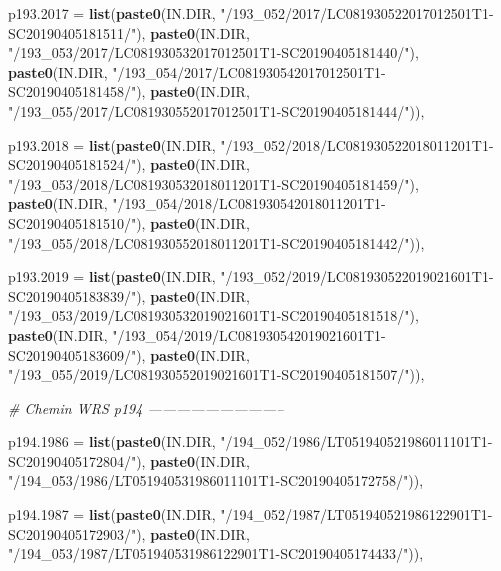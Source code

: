 \documentclass[a4paper, notitlepage, 12pt, krantz2]{krantz}
\newenvironment{Shaded}{\begin{snugshade}}{\end{snugshade}}
\newcommand{\CommentTok}[1]{\textcolor[rgb]{0.56,0.35,0.01}{\textit{#1}}}
\newcommand{\DataTypeTok}[1]{\textcolor[rgb]{0.13,0.29,0.53}{#1}}
\newcommand{\KeywordTok}[1]{\textcolor[rgb]{0.13,0.29,0.53}{\textbf{#1}}}
\newcommand{\NormalTok}[1]{#1}
\newcommand{\StringTok}[1]{\textcolor[rgb]{0.31,0.60,0.02}{#1}}
\begin{document}
\begin{Shaded}
\begin{Highlighting}[]
  \DataTypeTok{p193.2017 =} \KeywordTok{list}\NormalTok{(}\KeywordTok{paste0}\NormalTok{(IN.DIR, }\StringTok{"/193_052/2017/LC081930522017012501T1-SC20190405181511/"}\NormalTok{),}
                   \KeywordTok{paste0}\NormalTok{(IN.DIR, }\StringTok{"/193_053/2017/LC081930532017012501T1-SC20190405181440/"}\NormalTok{),}
                   \KeywordTok{paste0}\NormalTok{(IN.DIR, }\StringTok{"/193_054/2017/LC081930542017012501T1-SC20190405181458/"}\NormalTok{),}
                   \KeywordTok{paste0}\NormalTok{(IN.DIR, }\StringTok{"/193_055/2017/LC081930552017012501T1-SC20190405181444/"}\NormalTok{)),}

  \DataTypeTok{p193.2018 =} \KeywordTok{list}\NormalTok{(}\KeywordTok{paste0}\NormalTok{(IN.DIR, }\StringTok{"/193_052/2018/LC081930522018011201T1-SC20190405181524/"}\NormalTok{),}
                   \KeywordTok{paste0}\NormalTok{(IN.DIR, }\StringTok{"/193_053/2018/LC081930532018011201T1-SC20190405181459/"}\NormalTok{),}
                   \KeywordTok{paste0}\NormalTok{(IN.DIR, }\StringTok{"/193_054/2018/LC081930542018011201T1-SC20190405181510/"}\NormalTok{),}
                   \KeywordTok{paste0}\NormalTok{(IN.DIR, }\StringTok{"/193_055/2018/LC081930552018011201T1-SC20190405181442/"}\NormalTok{)),}

  \DataTypeTok{p193.2019 =} \KeywordTok{list}\NormalTok{(}\KeywordTok{paste0}\NormalTok{(IN.DIR, }\StringTok{"/193_052/2019/LC081930522019021601T1-SC20190405183839/"}\NormalTok{),}
                   \KeywordTok{paste0}\NormalTok{(IN.DIR, }\StringTok{"/193_053/2019/LC081930532019021601T1-SC20190405181518/"}\NormalTok{),}
                   \KeywordTok{paste0}\NormalTok{(IN.DIR, }\StringTok{"/193_054/2019/LC081930542019021601T1-SC20190405183609/"}\NormalTok{),}
                   \KeywordTok{paste0}\NormalTok{(IN.DIR, }\StringTok{"/193_055/2019/LC081930552019021601T1-SC20190405181507/"}\NormalTok{)),}

  \CommentTok{# Chemin WRS p194 -----------------------------}

  \DataTypeTok{p194.1986 =} \KeywordTok{list}\NormalTok{(}\KeywordTok{paste0}\NormalTok{(IN.DIR, }\StringTok{"/194_052/1986/LT051940521986011101T1-SC20190405172804/"}\NormalTok{),}
                   \KeywordTok{paste0}\NormalTok{(IN.DIR, }\StringTok{"/194_053/1986/LT051940531986011101T1-SC20190405172758/"}\NormalTok{)),}

  \DataTypeTok{p194.1987 =} \KeywordTok{list}\NormalTok{(}\KeywordTok{paste0}\NormalTok{(IN.DIR, }\StringTok{"/194_052/1987/LT051940521986122901T1-SC20190405172903/"}\NormalTok{),}
                   \KeywordTok{paste0}\NormalTok{(IN.DIR, }\StringTok{"/194_053/1987/LT051940531986122901T1-SC20190405174433/"}\NormalTok{)),}


\end{Highlighting}
\end{Shaded}
\end{document}
